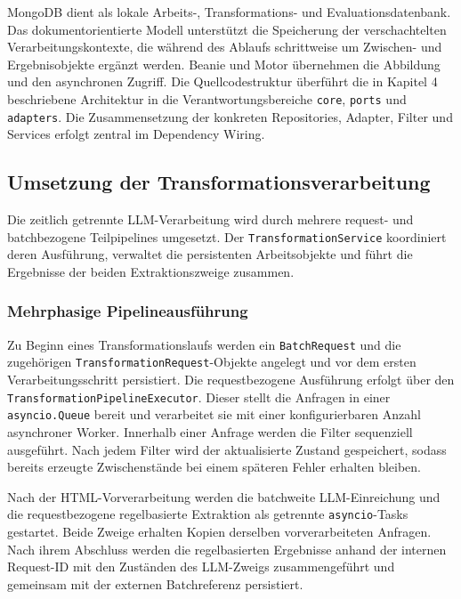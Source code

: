 MongoDB dient als lokale Arbeits-, Transformations- und Evaluationsdatenbank. Das dokumentorientierte Modell unterstützt die Speicherung der verschachtelten 
Verarbeitungskontexte, die während des Ablaufs schrittweise um Zwischen- und Ergebnisobjekte ergänzt werden. Beanie und Motor übernehmen die Abbildung und den 
asynchronen Zugriff. Die Quellcodestruktur überführt die in Kapitel 4 beschriebene Architektur in die Verantwortungsbereiche \texttt{core}, \texttt{ports} und 
\texttt{adapters}. Die Zusammensetzung der konkreten Repositories, Adapter, Filter und Services erfolgt zentral im Dependency Wiring.

\subsection{Umsetzung der Transformationsverarbeitung}

Die zeitlich getrennte LLM-Verarbeitung wird durch mehrere request- und batchbezogene Teilpipelines umgesetzt. Der \texttt{TransformationService} koordiniert deren 
Ausführung, verwaltet die persistenten Arbeitsobjekte und führt die Ergebnisse der beiden Extraktionszweige zusammen.

\subsubsection{Mehrphasige Pipelineausführung}

Zu Beginn eines Transformationslaufs werden ein \texttt{BatchRequest} und die zugehörigen \texttt{TransformationRequest}-Objekte angelegt und vor dem ersten 
Verarbeitungsschritt persistiert. Die requestbezogene Ausführung erfolgt über den \texttt{TransformationPipelineExecutor}. Dieser stellt die Anfragen in einer 
\texttt{asyncio.Queue} bereit und verarbeitet sie mit einer konfigurierbaren Anzahl asynchroner Worker. Innerhalb einer Anfrage werden die Filter sequenziell 
ausgeführt. Nach jedem Filter wird der aktualisierte Zustand gespeichert, sodass bereits erzeugte Zwischenstände bei einem späteren Fehler erhalten bleiben.

Nach der HTML-Vorverarbeitung werden die batchweite LLM-Einreichung und die requestbezogene regelbasierte Extraktion als getrennte \texttt{asyncio}-Tasks gestartet. 
Beide Zweige erhalten Kopien derselben vorverarbeiteten Anfragen. Nach ihrem Abschluss werden die regelbasierten Ergebnisse anhand der internen Request-ID mit den 
Zuständen des LLM-Zweigs zusammengeführt und gemeinsam mit der externen Batchreferenz persistiert.

